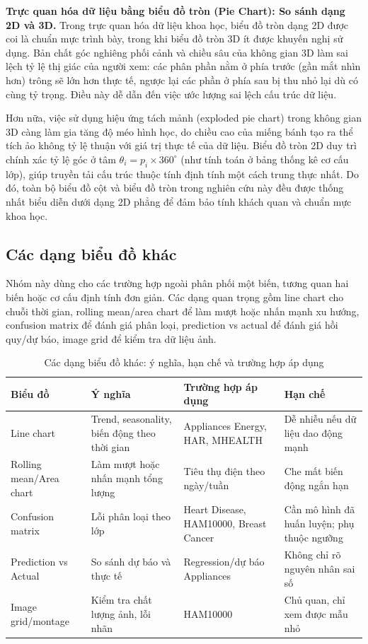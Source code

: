 \textbf{Trực quan hóa dữ liệu bằng biểu đồ tròn (Pie Chart): So sánh dạng 2D và 3D.} Trong trực quan hóa dữ liệu khoa học, biểu đồ tròn dạng 2D được coi là chuẩn mực trình bày, trong khi biểu đồ tròn 3D ít được khuyến nghị sử dụng. Bản chất góc nghiêng phối cảnh và chiều sâu của không gian 3D làm sai lệch tỷ lệ thị giác của người xem: các phân phần nằm ở phía trước (gần mắt nhìn hơn) trông sẽ lớn hơn thực tế, ngược lại các phần ở phía sau bị thu nhỏ lại dù có cùng tỷ trọng. Điều này dễ dẫn đến việc ước lượng sai lệch cấu trúc dữ liệu.

Hơn nữa, việc sử dụng hiệu ứng tách mảnh (exploded pie chart) trong không gian 3D càng làm gia tăng độ méo hình học, do chiều cao của miếng bánh tạo ra thể tích ảo không tỷ lệ thuận với giá trị thực tế của dữ liệu. Biểu đồ tròn 2D duy trì chính xác tỷ lệ góc ở tâm $\theta_i = p_i \times 360^\circ$ (như tính toán ở bảng thống kê cơ cấu lớp), giúp truyền tải cấu trúc thuộc tính định tính một cách trung thực nhất. Do đó, toàn bộ biểu đồ cột và biểu đồ tròn trong nghiên cứu này đều được thống nhất biểu diễn dưới dạng 2D phẳng để đảm bảo tính khách quan và chuẩn mực khoa học.

\subsection{Các dạng biểu đồ khác}

Nhóm này dùng cho các trường hợp ngoài phân phối một biến, tương quan hai biến hoặc cơ cấu định tính đơn giản. Các dạng quan trọng gồm line chart cho chuỗi thời gian, rolling mean/area chart để làm mượt hoặc nhấn mạnh xu hướng, confusion matrix để đánh giá phân loại, prediction vs actual để đánh giá hồi quy/dự báo, image grid để kiểm tra dữ liệu ảnh.

\begin{table}[H]
\centering
\caption{Các dạng biểu đồ khác: ý nghĩa, hạn chế và trường hợp áp dụng}
\label{tab:chapter1_other_chart_group}
\small
\begin{tabular}{p{}p{}p{}p{}}
\toprule
Biểu đồ & Ý nghĩa & Trường hợp áp dụng & Hạn chế \\
\midrule
Line chart & Trend, seasonality, biến động theo thời gian & Appliances Energy, HAR, MHEALTH & Dễ nhiễu nếu dữ liệu dao động mạnh \\
Rolling mean/Area chart & Làm mượt hoặc nhấn mạnh tổng lượng & Tiêu thụ điện theo ngày/tuần & Che mất biến động ngắn hạn \\
Confusion matrix & Lỗi phân loại theo lớp & Heart Disease, HAM10000, Breast Cancer & Cần mô hình đã huấn luyện; phụ thuộc ngưỡng \\
Prediction vs Actual & So sánh dự báo và thực tế & Regression/dự báo Appliances & Không chỉ rõ nguyên nhân sai số \\
Image grid/montage & Kiểm tra chất lượng ảnh, lỗi nhãn & HAM10000 & Chủ quan, chỉ xem được mẫu nhỏ \\
\bottomrule
\end{tabular}
\end{table}


